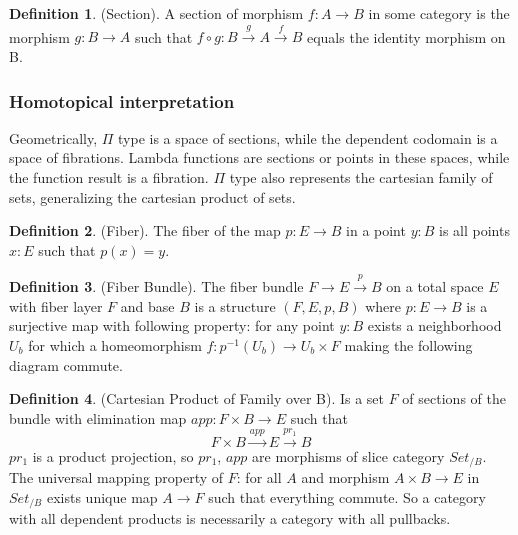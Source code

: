 \documentclass{article}
\theoremstyle{definition}
\newtheorem{definition}{Definition}
\begin{document}
\begin{definition} (Section).
A section of morphism $f: A \rightarrow B$ in some category is the morphism $g: B \rightarrow A$
such that $f \circ g: B \xrightarrow{g} A \xrightarrow{f} B$ equals the identity morphism on B.
\end{definition}

\subsubsection*{Homotopical interpretation}

Geometrically, $\Pi$ type is a space of sections, while the dependent codomain is a space of fibrations.
Lambda functions are sections or points in these spaces, while the function result is a fibration.
$\Pi$ type also represents the cartesian family of sets, generalizing the cartesian product of sets.

\begin{definition} (Fiber).
The fiber of the map $p: E \rightarrow B$ in a point $y: B$ is all points $x: E$ such that $p(x)=y$.
\end{definition}

\begin{definition} (Fiber Bundle).
The fiber bundle $ F \rightarrow E \xrightarrow{p} B$ on a total space $E$ with fiber layer $F$ and base $B$ is a
structure $(F,E,p,B)$ where $p: E \rightarrow B$ is a surjective map with following property:
for any point $y: B$ exists a neighborhood $U_b$ for which a homeomorphism $f: p^{-1}(U_b) \rightarrow U_b \times F$
making the following diagram commute.
\begin{center}
\end{center}
\end{definition}

\begin{definition} (Cartesian Product of Family over B).
Is a set $F$ of sections of the bundle with elimination map $app : F \times B \rightarrow E$ such that
\begin{equation}
F \times B \xrightarrow{app} E \xrightarrow{pr_1} B
\end{equation}
$pr_1$ is a product projection, so $pr_1$, $app$ are morphisms
of slice category $Set_{/B}$. The universal mapping property of $F$:
for all $A$ and morphism $A \times B \rightarrow E$ in $Set_{/B}$ exists
unique map $A \rightarrow F$ such that everything commute. So a category
with all dependent products is necessarily a category with all pullbacks.
\end{definition}
\end{document}
